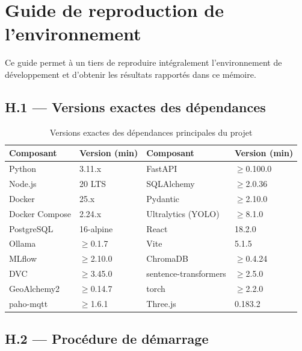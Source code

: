 \chapter{Guide de reproduction de l'environnement}
\label{ann:reproduction}

Ce guide permet à un tiers de reproduire intégralement l'environnement de développement
et d'obtenir les résultats rapportés dans ce mémoire.

\section*{H.1 — Versions exactes des dépendances}

\begin{table}[H]
\centering
\caption{Versions exactes des dépendances principales du projet}
\label{tab:versions}
\begin{tabular}{llll}
\toprule
\textbf{Composant} & \textbf{Version (min)} & \textbf{Composant} & \textbf{Version (min)} \\
\midrule
Python         & 3.11.x            & FastAPI            & $\geq$0.100.0 \\
Node.js        & 20 LTS            & SQLAlchemy         & $\geq$2.0.36 \\
Docker         & 25.x              & Pydantic           & $\geq$2.10.0 \\
Docker Compose & 2.24.x            & Ultralytics (YOLO) & $\geq$8.1.0 \\
PostgreSQL     & 16-alpine         & React              & 18.2.0 \\
Ollama         & $\geq$0.1.7       & Vite               & 5.1.5 \\
MLflow         & $\geq$2.10.0      & ChromaDB           & $\geq$0.4.24 \\
DVC            & $\geq$3.45.0      & sentence-transformers & $\geq$2.5.0 \\
GeoAlchemy2    & $\geq$0.14.7      & torch              & $\geq$2.2.0 \\
paho-mqtt      & $\geq$1.6.1       & Three.js           & 0.183.2 \\
\bottomrule
\end{tabular}
\end{table}

\section*{H.2 — Procédure de démarrage}

